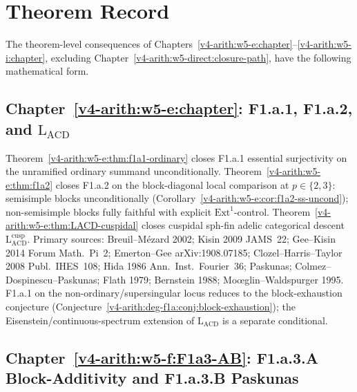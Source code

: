 \section{Theorem Record}
\label{v4-arith:w5-synth:per-chapter}

The theorem-level consequences of Chapters~\ref{v4-arith:w5-e:chapter}--\ref{v4-arith:w5-i:chapter}, excluding
Chapter~\ref{v4-arith:w5-direct:closure-path}, have the following
mathematical form.

\subsection{Chapter~\ref{v4-arith:w5-e:chapter}: F1.a.1, F1.a.2, and \(\mathrm{L}_{\mathrm{ACD}}\)}
\label{v4-arith:w5-synth:ch49}

Theorem~\ref{v4-arith:w5-e:thm:f1a1-ordinary}
closes F1.a.1 essential surjectivity on the unramified ordinary
summand unconditionally.
Theorem~\ref{v4-arith:w5-e:thm:f1a2} closes F1.a.2
on the block-diagonal local comparison at \(p\in\{2,3\}\): semisimple
blocks unconditionally
(Corollary~\ref{v4-arith:w5-e:cor:f1a2-ss-uncond}); non-semisimple blocks
fully faithful with explicit \(\mathrm{Ext}^{1}\)-control.
Theorem~\ref{v4-arith:w5-e:thm:LACD-cuspidal}
closes cuspidal sph-fin adelic categorical descent
\(\mathrm{L}_{\mathrm{ACD}}^{\mathrm{cusp}}\).
Primary sources: Breuil--M{\'e}zard 2002; Kisin 2009 JAMS~22;
Gee--Kisin 2014 Forum Math.~Pi~2; Emerton--Gee arXiv:1908.07185;
Clozel--Harris--Taylor 2008 Publ.~IHES~108; Hida 1986
Ann.~Inst.~Fourier~36; Paskunas; Colmez--Dospinescu--Paskunas;
Flath 1979; Bernstein 1988; Mo{\oe}glin--Waldspurger 1995.
F1.a.1 on the non-ordinary/supersingular locus reduces to the
block-exhaustion conjecture
(Conjecture~\ref{v4-arith:deg-f1a:conj:block-exhaustion});
the Eisenstein/continuous-spectrum extension of
\(\mathrm{L}_{\mathrm{ACD}}\) is a separate conditional.

\subsection{Chapter~\ref{v4-arith:w5-f:F1a3-AB}: F1.a.3.A Block-Additivity and F1.a.3.B Paskunas}
\label{v4-arith:w5-synth:ch50}

